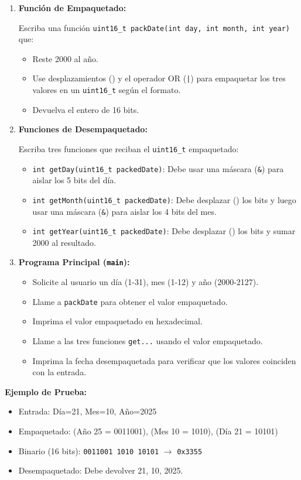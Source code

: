 \begin{enumerate}
    \item \textbf{Función de Empaquetado:}
    
    Escriba una función \texttt{uint16\_t packDate(int day, int month, int year)} que:
    \begin{itemize}
        \item Reste 2000 al año.
        \item Use desplazamientos (\texttt{\<\<}) y el operador OR (\texttt{|}) para empaquetar los tres valores en un \texttt{uint16\_t} según el formato.
        \item Devuelva el entero de 16 bits.
    \end{itemize}

    \item \textbf{Funciones de Desempaquetado:}
    
    Escriba tres funciones que reciban el \texttt{uint16\_t} empaquetado:
    \begin{itemize}
        \item \texttt{int getDay(uint16\_t packedDate)}: Debe usar una máscara (\texttt{\&}) para aislar los 5 bits del día.
        \item \texttt{int getMonth(uint16\_t packedDate)}: Debe desplazar (\texttt{\>\>}) los bits y luego usar una máscara (\texttt{\&}) para aislar los 4 bits del mes.
        \item \texttt{int getYear(uint16\_t packedDate)}: Debe desplazar (\texttt{\>\>}) los bits y sumar 2000 al resultado.
    \end{itemize}

    \item \textbf{Programa Principal (\texttt{main}):}
    \begin{itemize}
        \item Solicite al usuario un día (1-31), mes (1-12) y año (2000-2127).
        \item Llame a \texttt{packDate} para obtener el valor empaquetado.
        \item Imprima el valor empaquetado en hexadecimal.
        \item Llame a las tres funciones \texttt{get...} usando el valor empaquetado.
        \item Imprima la fecha desempaquetada para verificar que los valores coinciden con la entrada.
    \end{itemize}
\end{enumerate}

\textbf{Ejemplo de Prueba:}

\begin{itemize}
    \item Entrada: Día=21, Mes=10, Año=2025
    \item Empaquetado: (Año 25 = 0011001), (Mes 10 = 1010), (Día 21 = 10101)
    \item Binario (16 bits): \texttt{0011001 1010 10101} $\rightarrow$ \texttt{0x3355}
    \item Desempaquetado: Debe devolver 21, 10, 2025.
\end{itemize}
